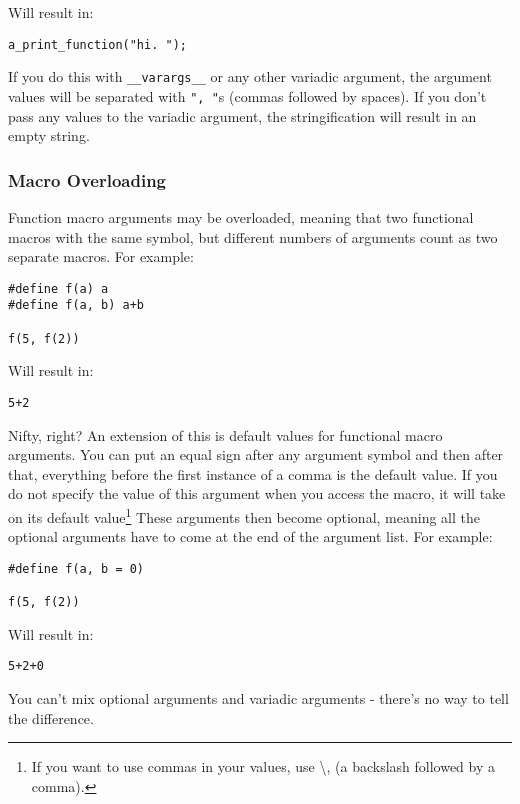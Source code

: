 \documentclass[10pt,a4paper]{article}
\begin{document}
Will result in:
\begin{verbatim}
a_print_function("hi. ");
\end{verbatim}

If you do this with \verb|__varargs__| or any other variadic argument, the argument values will be separated with \verb|", "|s (commas followed by spaces). If you don't pass any values to the variadic argument, the stringification will result in an empty string.

\newpage





\subsubsection{Macro Overloading}
Function macro arguments may be overloaded, meaning that two functional macros with the same symbol, but different numbers of arguments count as two separate macros. For example:
\begin{verbatim}
#define f(a) a
#define f(a, b) a+b

f(5, f(2))
\end{verbatim}

Will result in:
\begin{verbatim}
5+2
\end{verbatim}

Nifty, right? An extension of this is default values for functional macro arguments. You can put an equal sign after any argument symbol and then after that, everything before the first instance of a comma is the default value. If you do not specify the value of this argument when you access the macro, it will take on its default value\footnote{If you want to use commas in your values, use \textbackslash, (a backslash followed by a comma).} These arguments then become optional, meaning all the optional arguments have to come at the end of the argument list. For example:
\begin{verbatim}
#define f(a, b = 0)

f(5, f(2))
\end{verbatim}

Will result in:
\begin{verbatim}
5+2+0
\end{verbatim}

You can't mix optional arguments and variadic arguments - there's no way to tell the difference. 

\newpage
\end{document}
